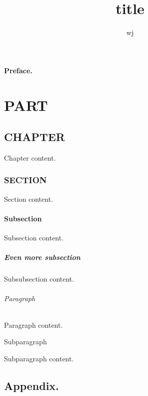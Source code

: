 \documentclass[12pt]{book}
\begin{document}

\frontmatter

\title{title}
\author{wj}
\date{}
\maketitle


\renewcommand{\contentsname}{table of contents}
\tableofcontents

\renewcommand{\listfigurename}{list of figures}
\listoffigures

\renewcommand{\listtablename}{list of tables}
\listoftables


\subsection*{Preface.}			%

\mainmatter
\part{PART}		%

\chapter{CHAPTER}
Chapter content.

\section{SECTION}
Section content.

\subsection{Subsection}
Subsection content.

\subsubsection{Even more subsection}
Subsubsection content.

\paragraph{Paragraph}
Paragraph content.

\subparagraph{Subparagraph}
Subparagraph content.

\appendix
\chapter{Appendix.}
\end{document}
